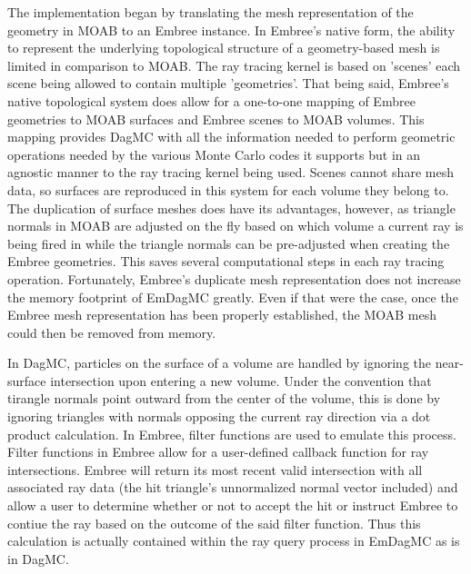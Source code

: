 \documentclass{anstrans}
\begin{document}
The implementation began by translating the mesh representation of the geometry in MOAB to an Embree instance. In Embree's native form, the ability to represent the underlying topological structure of a geometry-based mesh is limited in comparison to MOAB. The ray tracing kernel is based on 'scenes' each scene being allowed to contain multiple 'geometries'. That being said, Embree's native topological system does allow for a one-to-one mapping of Embree geometries to MOAB surfaces and Embree scenes to MOAB volumes. This mapping provides DagMC with all the information needed to perform geometric operations needed by the various Monte Carlo codes it supports but in an agnostic manner to the ray tracing kernel being used. Scenes cannot share mesh data, so surfaces are reproduced in this system for each volume they belong to. The duplication of surface meshes does have its advantages, however, as triangle normals in MOAB are adjusted on the fly based on which volume a current ray is being fired in while the triangle normals can be pre-adjusted when creating the Embree geometries. This saves several computational steps in each ray tracing operation. Fortunately, Embree's duplicate mesh representation does not increase the memory footprint of EmDagMC greatly. Even if that were the case, once the Embree mesh representation has been properly established, the MOAB mesh could then be removed from memory.

In DagMC, particles on the surface of a volume are handled by ignoring the near-surface intersection upon entering a new volume. Under the convention that tirangle normals point outward from the center of the volume, this is done by ignoring triangles with normals opposing the current ray direction via a dot product calculation. In Embree, filter functions are used to emulate this process. Filter functions in Embree allow for a user-defined callback function for ray intersections. Embree will return its most recent valid intersection with all associated ray data (the hit triangle's unnormalized normal vector included) and allow a user to determine whether or not to accept the hit or instruct Embree to contiue the ray based on the outcome of the said filter function. Thus this calculation is actually contained within the ray query process in EmDagMC as is in DagMC.

\end{document}
